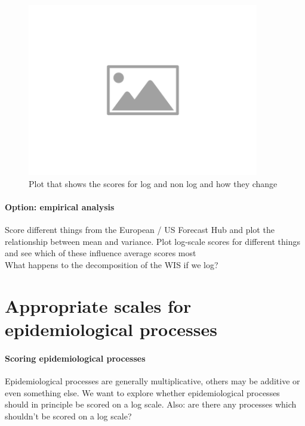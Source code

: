 \documentclass{article}
\begin{document}
\begin{figure}[h!]
    \centering
    \includegraphics[width=0.9\textwidth]{output/placeholder-image.png}
    \caption{Plot that shows the scores for log and non log and how they change}
    \label{fig:change-in-scores}
\end{figure}

\paragraph{Option: empirical analysis} 
Score different things from the European / US Forecast Hub and plot the relationship between mean and variance. Plot log-scale scores for different things and see which of these influence average scores most \\
What happens to the decomposition of the WIS if we log? 



\section{Appropriate scales for epidemiological processes}

\paragraph{Scoring epidemiological processes}
Epidemiological processes are generally multiplicative, others may be additive or even something else. We want to explore whether epidemiological processes should in principle be scored on a log scale. Also: are there any processes which shouldn't be scored on a log scale? 
\end{document}
